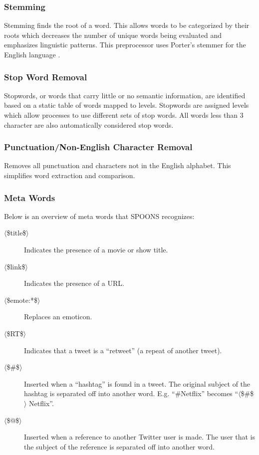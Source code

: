 \documentclass[12pt]{ucthesis}
\begin{document}
\subsubsection{Stemming}
\label{class-filter-stemming}
Stemming finds the root of a word. This allows words to be categorized by their roots which
decreases the number of unique words being evaluated and emphasizes linguistic patterns.
This preprocessor uses Porter's stemmer for the English language \cite{porters}.

\subsubsection{Stop Word Removal}
\label{class-filter-stopword}
Stopwords, or words that carry little or no semantic information, are identified based
on a static table of words mapped to levels. Stopwords are assigned levels which allow
processes to use different sets of stop words. All words less than 3 character are also
automatically considered stop words.

\subsubsection{Punctuation/Non-English Character Removal}
\label{class-filter-noneng}
Removes all punctuation and
characters not in the English alphabet. This simplifies word extraction and
comparison.

\subsubsection{Meta Words}
\label{class-filter-meta}
Below is an overview of meta words that SPOONS recognizes:

\begin{description}
   \item[$\langle$\$title\$$\rangle$] Indicates the presence of a movie or show title.
   \item[$\langle$\$link\$$\rangle$] Indicates the presence of a URL.
   \item[$\langle$\$emote:*\$$\rangle$] Replaces an emoticon.
   \item[$\langle$\$RT\$$\rangle$] Indicates that a tweet is a ``retweet'' (a repeat of another tweet).
   \item[$\langle$\$\#\$$\rangle$] Inserted when a ``hashtag'' is found in a tweet. The original subject of the hashtag is separated off into another word. E.g. ``\#Netflix'' becomes ``$\langle$\$\#\$$\rangle$ Netflix''.
   \item[$\langle$\$@\$$\rangle$] Inserted when a reference to another Twitter user is made. The user that is the subject of the reference is separated off into another word.
\end{description}
\end{document}

